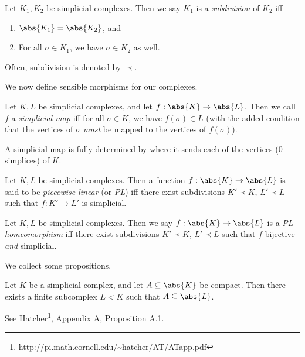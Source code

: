 \begin{definition}[Subdivision]
  Let $K_1, K_2$ be simplicial complexes. Then we say $K_1$ is a
  \emph{subdivision} of $K_2$ iff
  \begin{enumerate}
    \item $\abs{K_1} = \abs{K_2}$, and
    \item For all $\sigma \in K_1$, we have $\sigma \in K_2$ as well.
  \end{enumerate}
  Often, subdivision is denoted by $\prec$.
\end{definition}

We now define sensible morphisms for our complexes.
\begin{definition}
  Let $K, L$ be simplicial complexes, and let $f : \abs{K} \to
  \abs{L}$. Then we call $f$ a \emph{simplicial map} iff for all
  $\sigma \in K$, we have $f(\sigma) \in L$ (with the added condition
  that the vertices of $\sigma$ \emph{must} be mapped to the vertices
  of $f(\sigma)$).
\end{definition}
\begin{proposition}
  A simplicial map is fully determined by where it sends each of the
  vertices (0-simplices) of $K$.
\end{proposition}
\begin{definition}
  Let $K, L$ be simplicial complexes. Then a function $f : \abs{K} \to
  \abs{L}$ is said to be \emph{piecewise-linear} (or \emph{PL}) iff
  there exist subdivisions $K' \prec K$, $L' \prec L$ such that $f :
  K' \to L'$ is simplicial.
\end{definition}
\begin{definition}[PL Homeomorphism]
  Let $K, L$ be simplicial complexes. Then we say $f : \abs{K} \to
  \abs{L}$ is a \emph{PL homeomorphism} iff there exist subdivisions
  $K' \prec K$, $L' \prec L$ such that $f$ bijective \emph{and}
  simplicial.
\end{definition}
We collect some propositions.
\begin{proposition}\label{prop:compact-finite}
  Let $K$ be a simplicial complex, and let $A \subseteq \abs{K}$ be
  compact. Then there exists a finite subcomplex $L < K$ such that
  $A\subseteq \abs{L}$.
\end{proposition}
\begin{sproof}
  See
  Hatcher\footnote{\url{http://pi.math.cornell.edu/~hatcher/AT/ATapp.pdf}},
  Appendix A, Proposition A.1.
\end{sproof}
